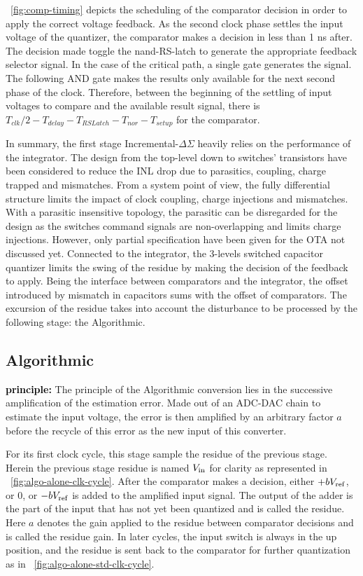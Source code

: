 \figurename~\ref{fig:comp-timing} depicts the scheduling of the comparator decision in order to apply the correct voltage feedback. As the second clock phase settles the input voltage of the quantizer, the comparator makes a decision in less than 1 ns after. The decision made toggle the nand-RS-latch to generate the appropriate feedback selector signal. In the case of the critical path, a single gate generates the signal. The following AND gate makes the results only available for the next second phase of the clock. Therefore, between the beginning of the settling of input voltages to compare and the available result signal, there is \(T_{clk}/2-T_{delay}-T_{RSLatch}-T_{nor}-T_{setup}\) for the comparator.

In summary, the first stage Incremental-$\Delta\Sigma$ heavily relies on the performance of the integrator. The design from the top-level down to switches' transistors have been considered to reduce the INL drop due to parasitics, coupling, charge trapped and mismatches. From a system point of view, the fully differential structure limits the impact of clock coupling, charge injections and mismatches. With a parasitic insensitive topology, the parasitic can be disregarded for the design as the switches command signals are non-overlapping and limits charge injections. However, only partial specification have been given for the OTA not discussed yet.
Connected to the integrator, the 3-levels switched capacitor quantizer limits the swing of the residue by making the decision of the feedback to apply. Being the interface between comparators and the integrator, the offset introduced by mismatch in capacitors sums with the offset of comparators. The excursion of the residue takes into account the disturbance to be processed by the following stage: the Algorithmic.
\clearpage
	 
\subsection{Algorithmic}                    %
\textbf{\textcolor{black}{principle:}}
The principle of the Algorithmic conversion lies in the successive amplification of the estimation error. Made out of an ADC-DAC chain to estimate the input voltage, the error is then amplified by an arbitrary factor $a$ before the recycle of this error as the new input of this converter.

For its first clock cycle, this stage sample the residue of the previous stage. Herein the previous stage residue is named \(V_{\rm in}\) for clarity as represented in \figurename~\ref{fig:algo-alone-clk-cycle}. After the comparator makes a decision, either \(+bV_{\rm ref} \), or 0, or \(-bV_{\rm ref} \) is added to the amplified input signal. The output of the adder is the part of the input that has not yet been quantized and is called the residue. Here \(a\) denotes the gain applied to the residue between comparator decisions and is called the residue gain. In later cycles, the input switch is always in the up position, and the residue is sent back to the comparator for further quantization as in \figurename~\ref{fig:algo-alone-std-clk-cycle}.

